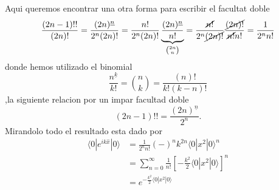 Aqui queremos encontrar una otra forma para escribir el facultat doble
$$
	\frac{(2n-1)!!}{(2n)!} = \frac{(2n)^{\underline{n}}}{2^n (2n)!} =
\frac{n!}{2^n(2n)!} \underbrace{\frac{(2n)^{\underline{n}}}{n!}}_{\binom{2n}{n}}
= \frac{\cancel{n!}}{2^n \cancel{(2n)!}} \frac{\cancel{(2n)!}}{\cancel{n!} n!} =
\frac{1}{2^n n!}
$$
donde hemos utilizado el binomial
$$
	\frac{n^{\underline{k}}}{k!} = \binom{n}{k} = \frac{(n)!}{k!(k-n)!}
$$ 
,la siguiente relacion por un impar facultad doble
$$
	(2n - 1)!! = \frac{(2n)^{\underline{n}}}{2^n}.
$$
Mirandolo todo el resultado esta dado por
\begin{align*}
	\langle 0 | e^{ik\hat x} | 0 \rangle &= \frac{1}{2^n n!} (-)^n k^{2n} \langle
0 | x^2 | 0 \rangle^n  \\
	&= \sum_{n=0}^\infty \frac{1}{n!} \left[ - \frac{k^2}{2} \langle 0 | x^2 | 0
\rangle \right]^n \\
	&= e^{-\frac{k^2}{2} \langle 0 | x^2 | 0 \rangle}
\end{align*}
